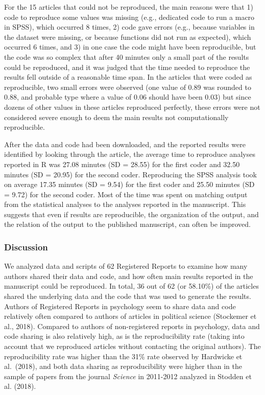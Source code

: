 \documentclass[
  ,jou, a4paper,floatsintext]{apa6}
\begin{document}
For the 15 articles that could not be reproduced, the main reasons were that 1) code to reproduce some values was missing (e.g., dedicated code to run a macro in SPSS), which occurred 8 times, 2) code gave errors (e.g., because variables in the dataset were missing, or because functions did not run as expected), which occurred 6 times, and 3) in one case the code might have been reproducible, but the code was so complex that after 40 minutes only a small part of the results could be reproduced, and it was judged that the time needed to reproduce the results fell outside of a reasonable time span. In the articles that were coded as reproducible, two small errors were observed (one value of 0.89 was rounded to 0.88, and probable type where a value of 0.06 should have been 0.03) but since dozens of other values in these articles reproduced perfectly, these errors were not considered severe enough to deem the main results not computationally reproducible.

After the data and code had been downloaded, and the reported results were identified by looking through the article, the average time to reproduce analyses reported in R was 27.08 minutes (SD = 28.55) for the first coder and 32.50 minutes (SD = 20.95) for the second coder. Reproducing the SPSS analysis took on average 17.35 minutes (SD = 9.54) for the first coder and 25.50 minutes (SD = 9.72) for the second coder. Most of the time was spent on matching output from the statistical analyses to the analyses reported in the manuscript. This suggests that even if results are reproducible, the organization of the output, and the relation of the output to the published manuscript, can often be improved.

\hypertarget{discussion}{%
\subsubsection{Discussion}\label{discussion}}

We analyzed data and scripts of 62 Registered Reports to examine how many authors shared their data and code, and how often main results reported in the manuscript could be reproduced. In total, 36 out of 62 (or 58.10\%) of the articles shared the underlying data and the code that was used to generate the results. Authors of Registered Reports in psychology seem to share data and code relatively often compared to authors of articles in political science (Stockemer et al., 2018). Compared to authors of non-registered reports in psychology, data and code sharing is also relatively high, as is the reproducibility rate (taking into account that we reproduced articles without contacting the original authors). The reproducibility rate was higher than the 31\% rate observed by Hardwicke et al.~(2018), and both data sharing as reproducibility were higher than in the sample of papers from the journal \emph{Science} in 2011-2012 analyzed in Stodden et al. (2018).
\end{document}
